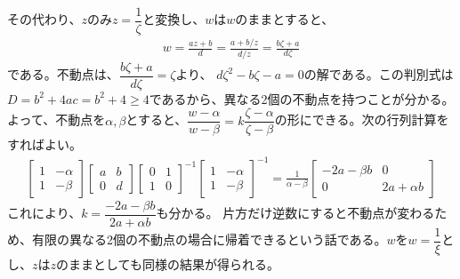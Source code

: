 その代わり、$z$のみ$z=\dfrac{1}{\zeta}$と変換し、$w$は$w$のままとすると、
\begin{align*}
    w=\frac{az+b}{d}=\frac{a+b/z}{d/z}=\frac{b\zeta+a}{d\zeta}
\end{align*}
である。不動点は、$\dfrac{b\zeta+a}{d\zeta}=\zeta$より、
$d\zeta^2-b\zeta-a=0$の解である。この判別式は$D=b^2+4ac=b^2+4\ge4$であるから、異なる2個の不動点を持つことが分かる。よって、不動点を$\alpha,\beta$とすると、$\dfrac{w-\alpha}{w-\beta}=k\dfrac{\zeta-\alpha}{\zeta-\beta}$の形にできる。次の行列計算をすればよい。
\begin{align*}
    \begin{bmatrix}
        1&-\alpha\\1&-\beta
    \end{bmatrix}
    \begin{bmatrix}
        a&b\\0&d
    \end{bmatrix}
    \begin{bmatrix}
        0&1\\1&0
    \end{bmatrix}^{-1}
    \begin{bmatrix}
        1&-\alpha\\1&-\beta
    \end{bmatrix}^{-1}
    =\frac{1}{\alpha-\beta}
    \begin{bmatrix}
        -2a-\beta b&0\\0&2a+\alpha b
    \end{bmatrix}
\end{align*}
これにより、$k=\dfrac{-2a-\beta b}{2a+\alpha b}$も分かる。
片方だけ逆数にすると不動点が変わるため、有限の異なる2個の不動点の場合に帰着できるという話である。$w$を$w=\dfrac{1}{\xi}$とし、$z$は$z$のままとしても同様の結果が得られる。